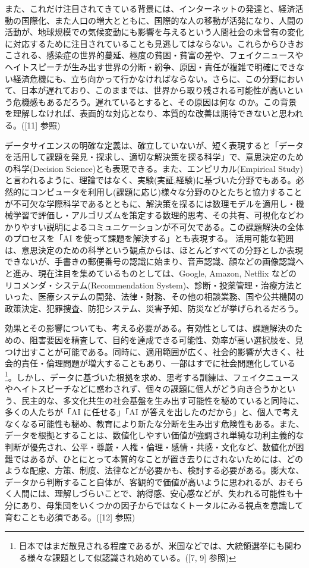 \documentclass[
]{bxjsbook}
\theoremstyle{definition}
\theoremstyle{definition}
\theoremstyle{definition}
\theoremstyle{definition}
\theoremstyle{remark}
\begin{document}
また、これだけ注目されてきている背景には、インターネットの発達と、経済活動の国際化、また人口の増大とともに、国際的な人の移動が活発になり、人間の活動が、地球規模での気候変動にも影響を与えるという人間社会の未曾有の変化に対応するために注目されていることも見逃してはならない。これらからひきおこされる、感染症の世界的蔓延、極度の貧困・貧富の差や、フェイクニュースやヘイトスピーチが生み出す世界の分断・紛争、原因・責任が複雑で明確にできない経済危機にも、立ち向かって行かなければならない。さらに、この分野において、日本が遅れており、このままでは、世界から取り残される可能性が高いという危機感もあるだろう。遅れているとすると、その原因は何な
のか。この背景を理解しなければ、表面的な対応となり、本質的な改善は期待できないと思われる。({[}11{]} 参照)

データサイエンスの明確な定義は、確立していないが、短く表現すると「データを活用して課題を発見・探求し、適切な解決策を探る科学」で、意思決定のための科学(Decision Science)とも表現できる。また、エンピリカル(Empirical Study)と言われるように、理論ではなく、実験(実証,経験)に基づいた分野でもある。必然的にコンピュータを利用し(課題に応じ)様々な分野のひとたちと協力することが不可欠な学際科学であるとともに、解決策を探るには数理モデルを適用し・機械学習で評価し・アルゴリズムを策定する数理的思考、その共有、可視化などわかりやすい説明によるコミュニケーションが不可欠である。この課題解決の全体のプロセスを「AI を使って課題を解決する」とも表現する。 活用可能な範囲は、意思決定のための科学という観点からは、ほとんどすべての分野としか表現できないが、手書きの郵便番号の認識に始まり、音声認識、顔などの画像認識へと進み、現在注目を集めているものとしては、Google, Amazon, Netflix などのリコメンダ・システム(Recommendation System)、診断・投薬管理・治療方法といった、医療システムの開発、法律・財務、その他の相談業務、国や公共機関の政策決定、犯罪捜査、防犯システム、災害予知、防災などが挙げられるだろう。

効果とその影響についても、考える必要がある。有効性としては、課題解決のための、阻害要因を精査して、目的を達成できる可能性、効率が高い選択肢を、見つけ出すことが可能である。同時に、適用範囲が広く、社会的影響が大きく、社会的責任・倫理問題が増大することもあり、一部はすでに社会問題化している\footnote{日本ではまだ散見される程度であるが、米国などでは、大統領選挙にも関わる様々な課題として似認識され始めている。({[}7, 9{]} 参照)}。しかし、データに基づいた根拠を求め、思考する訓練は、フェイクニュースやヘイトスピーチなどに惑わされず、個々の課題に個人がどう向き合うかという、民主的な、多文化共生の社会基盤を生み出す可能性を秘めていると同時に、多くの人たちが「AI に任せる」「AI が答えを出したのだから」と、個人で考えなくなる可能性も秘め、教育により新たな分断を生み出す危険性もある。また、データを根拠とすることは、数値化しやすい価値が強調され単純な功利主義的な判断が優先され、公平・尊厳・人権・倫理・感情・共感・文化など、数値化が困難ではあるが、ひとにとって本質的なことが置き去りにされないためには、どのような配慮、方策、制度、法律などが必要かも、検討する必要がある。膨大な、データから判断すること自体が、客観的で価値が高いように思われるが、おそらく人間には、理解しづらいことで、納得感、安心感などが、失われる可能性も十分にあり、母集団をいくつかの因子からではなくトータルにみる視点を意識して育むことも必須である。({[}12{]} 参照)
\end{document}
